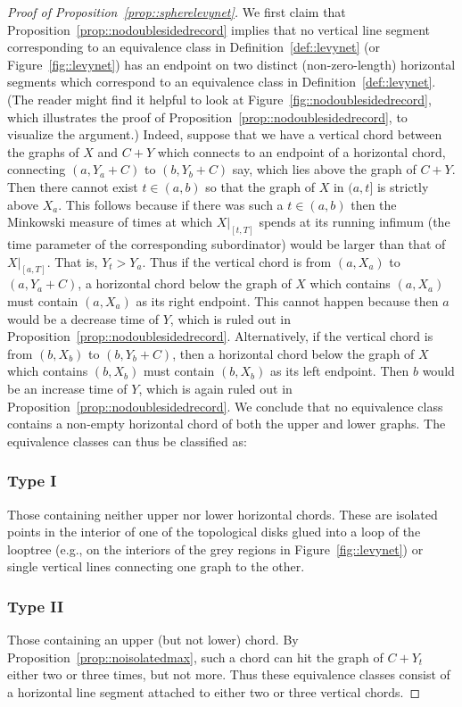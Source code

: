 \documentclass[10pt]{amsart}
\theoremstyle{plain}
\numberwithin{theorem}{section}
\theoremstyle{definition}
\begin{document}
\begin{proof}[Proof of Proposition~\ref{prop::spherelevynet}]
We first claim that Proposition~\ref{prop::nodoublesidedrecord} implies that no vertical line segment corresponding to an equivalence class in Definition~\ref{def::levynet} (or Figure~\ref{fig::levynet}) has an endpoint on two distinct (non-zero-length) horizontal segments which correspond to an equivalence class in Definition~\ref{def::levynet}. (The reader might find it helpful to look at Figure~\ref{fig::nodoublesidedrecord}, which illustrates the proof of Proposition~\ref{prop::nodoublesidedrecord}, to visualize the argument.) Indeed, suppose that we have a vertical chord between the graphs of $X$ and $C+Y$ which connects to an endpoint of a horizontal chord, connecting $(a,Y_a+C)$ to $(b,Y_b+C)$ say, which lies above the graph of $C+Y$. Then there cannot exist $t \in (a,b)$ so that the graph of $X$ in $(a,t]$ is strictly above $X_a$. This follows because if there was such a $t \in (a,b)$ then the Minkowski measure of times at which $X|_{[t,T]}$ spends at its running infimum (\ie the time parameter of the corresponding subordinator) would be larger than that of $X|_{[a,T]}$. That is, $Y_t > Y_a$. Thus if the vertical chord is from $(a,X_a)$ to $(a,Y_a+C)$, a horizontal chord below the graph of $X$ which contains $(a,X_a)$ must contain $(a,X_a)$ as its right endpoint. This cannot happen because then $a$ would be a decrease time of $Y$, which is ruled out in Proposition~\ref{prop::nodoublesidedrecord}. Alternatively, if the vertical chord is from $(b,X_b)$ to $(b,Y_b+C)$, then a horizontal chord below the graph of $X$ which contains $(b,X_b)$ must contain $(b,X_b)$ as its left endpoint. Then $b$ would be an increase time of $Y$, which is again ruled out in Proposition~\ref{prop::nodoublesidedrecord}. We conclude that no equivalence class contains a non-empty horizontal chord of both the upper and lower graphs. The equivalence classes can thus be classified as:\enlargethispage{.8\baselineskip}%

\subsubsection*{Type I}
Those containing neither upper nor lower horizontal chords. These are isolated points in the interior of one of the topological disks glued into a loop of the looptree (e.g., on the interiors of the grey regions in Figure~\ref{fig::levynet}) or single vertical lines connecting one graph to the other.
\subsubsection*{Type II}
Those containing an upper (but not lower) chord. By Proposition~\ref{prop::noisolatedmax}, such a chord can hit the graph of $C+Y_t$ either two or three times, but not more. Thus these equivalence classes consist of a horizontal line segment attached to either two or three vertical chords.

\end{proof}
\end{document}

